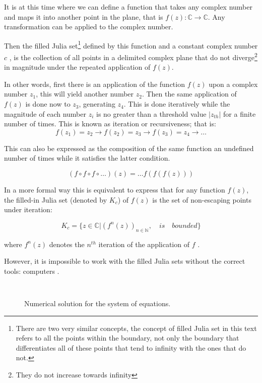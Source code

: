 \documentclass{article}
\begin{document}
It is at this time where we can define a function that takes any complex number and maps it into another point in the plane, that is $f(z):\mathbb{C}\rightarrow \mathbb{C}$. Any transformation can be applied to the complex number.

Then the filled Julia set\footnote{There are two very similar concepts, the concept of filled Julia set in this text refers to all the points within the boundary,  not only the boundary that differentiates all of these points that tend to infinity with the ones that do not.} defined by this function and a constant complex number $c$ , is the collection of all points in a delimited complex plane that do not diverge\footnote{They do not increase towards infinity} in magnitude under the repeated application of $f(z)$\cite{csc}.

In other words, first there is an application of the function $f(z)$ upon a complex number $z_1$, this will yield another number $z_2$. Then the same application of $f(z)$ is done now to $z_3$, generating $z_4$. This is done iteratively while the magnitude of each number $z_i$ is no greater than a threshold value $|z_{th}|$ for a finite number of times\cite{coursera}. This is known as iteration or recursiveness; that is:
\begin{equation}
    f(z_1)=z_2 \longrightarrow f(z_2)=z_3 \longrightarrow f(z_3)=z_4 \longrightarrow \dots
\end{equation}

This can also be expressed as the composition of the same function an undefined number of times while it satisfies the latter condition.

\begin{equation}
    (f\circ f \circ f \circ \dots )(z) = \dots f(f(f(z)))
\end{equation}

In a more formal way this is equivalent to express that for any function $f(z)$, the filled-in Julia set (denoted by $K_c$) of $f(z)$ is the set of non-escaping points under iteration:

\begin{equation}
    K_c = \{z \in \mathbb{C}| (f^n(z))_{n \in \mathbb{N}}, \quad is \quad bounded\}
\end{equation}

where $f^n(z)$ denotes the $n^{th}$ iteration of the application of $f$ \cite{Lei}.

However, it is impossible to work with the filled Julia sets without the correct tools: computers \cite{Devaney}. 

\begin{lstlisting}[language=Python, frame=single]



\end{lstlisting}


\begin{figure}[h]
    \caption{Numerical solution for the system of equations.}
    \label{fig:sol}
\end{figure}


\newpage
\printbibliography[title = {References}]
\end{document}
